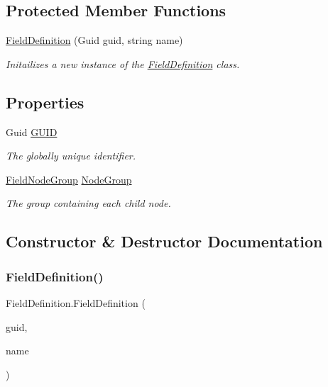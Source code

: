 \subsection*{Protected Member Functions}
\begin{DoxyCompactItemize}
\item 
\hyperlink{class_field_definition_a280ce8e3246dee627de3e0c1561f897d}{Field\+Definition} (Guid guid, string name)
\begin{DoxyCompactList}\small\item\em Initailizes a new instance of the \hyperlink{class_field_definition}{Field\+Definition} class. \end{DoxyCompactList}\end{DoxyCompactItemize}
\subsection*{Properties}
\begin{DoxyCompactItemize}
\item 
Guid \hyperlink{class_field_definition_aedeba7c34e3c6bc5a6a34cfd335aa75e}{G\+U\+ID}
\begin{DoxyCompactList}\small\item\em The globally unique identifier. \end{DoxyCompactList}\item 
\hyperlink{class_field_node_group}{Field\+Node\+Group} \hyperlink{class_field_definition_aa65595b10037eab102872bcca4934ea3}{Node\+Group}
\begin{DoxyCompactList}\small\item\em The group containing each child node. \end{DoxyCompactList}\end{DoxyCompactItemize}


\subsection{Constructor \& Destructor Documentation}
\mbox{\label{class_field_definition_a280ce8e3246dee627de3e0c1561f897d}} 
\subsubsection{\texorpdfstring{Field\+Definition()}{FieldDefinition()}}
{\footnotesize\ttfamily Field\+Definition.\+Field\+Definition (\begin{DoxyParamCaption}\item[{Guid}]{guid,  }\item[{string}]{name }\end{DoxyParamCaption})\hspace{0.3cm}{\ttfamily [protected]}}




